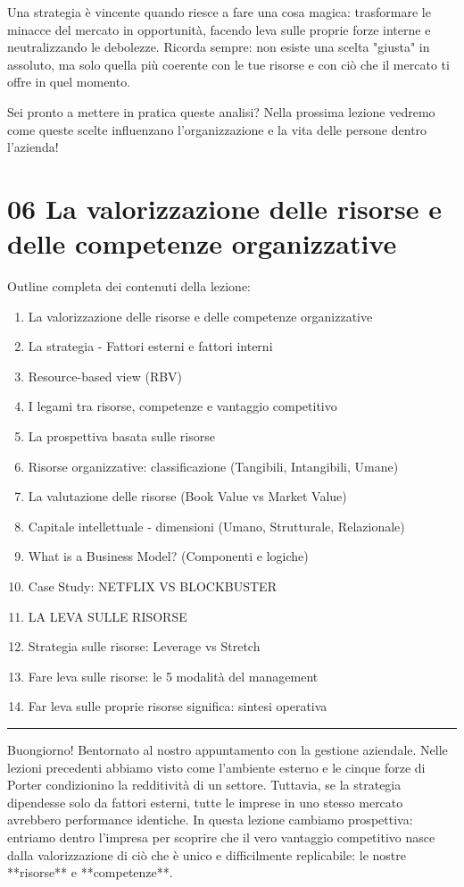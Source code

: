 \documentclass[a4paper,10pt]{article}
\begin{document}
Una strategia è vincente quando riesce a fare una cosa magica: trasformare le minacce del mercato in opportunità, facendo leva sulle proprie forze interne e neutralizzando le debolezze. Ricorda sempre: non esiste una scelta "giusta" in assoluto, ma solo quella più coerente con le tue risorse e con ciò che il mercato ti offre in quel momento. 

Sei pronto a mettere in pratica queste analisi? Nella prossima lezione vedremo come queste scelte influenzano l'organizzazione e la vita delle persone dentro l'azienda!

\section*{06 La valorizzazione delle risorse e delle competenze organizzative}

Outline completa dei contenuti della lezione:
{\small
\begin{enumerate}
\item La valorizzazione delle risorse e delle competenze organizzative
\item La strategia - Fattori esterni e fattori interni
\item Resource-based view (RBV)
\item I legami tra risorse, competenze e vantaggio competitivo
\item La prospettiva basata sulle risorse
\item Risorse organizzative: classificazione (Tangibili, Intangibili, Umane)
\item La valutazione delle risorse (Book Value vs Market Value)
\item Capitale intellettuale - dimensioni (Umano, Strutturale, Relazionale)
\item What is a Business Model? (Componenti e logiche)
\item Case Study: NETFLIX VS BLOCKBUSTER
\item LA LEVA SULLE RISORSE
\item Strategia sulle risorse: Leverage vs Stretch
\item Fare leva sulle risorse: le 5 modalità del management
\item Far leva sulle proprie risorse significa: sintesi operativa
\end{enumerate}
}
\hrule
\vspace{0.5cm}

Buongiorno! Bentornato al nostro appuntamento con la gestione aziendale. Nelle lezioni precedenti abbiamo visto come l'ambiente esterno e le cinque forze di Porter condizionino la redditività di un settore. Tuttavia, se la strategia dipendesse solo da fattori esterni, tutte le imprese in uno stesso mercato avrebbero performance identiche. In questa lezione cambiamo prospettiva: entriamo dentro l'impresa per scoprire che il vero vantaggio competitivo nasce dalla valorizzazione di ciò che è unico e difficilmente replicabile: le nostre **risorse** e **competenze**.
\end{document}
